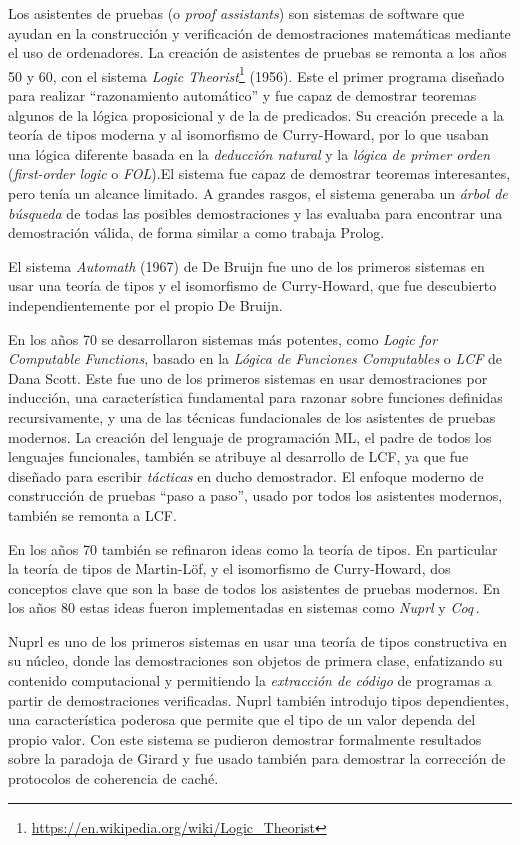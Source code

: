 \documentclass[
  a4paper, 
  10pt, 
  parskip=half, 
  toc=bibliography,
]{scrbook}
\theoremstyle{definition}
\theoremstyle{bolddef}
\begin{document}
Los asistentes de pruebas (o \emph{proof assistants}) son sistemas de software que ayudan en la
construcción y verificación de demostraciones matemáticas mediante el uso de
ordenadores. La creación de asistentes de pruebas se remonta a los años 50 y 60, con
el sistema \emph{Logic Theorist}\footnote{\url{https://en.wikipedia.org/wiki/Logic_Theorist}} (1956). 
Este el primer programa diseñado para realizar \enquote{razonamiento automático} y
fue capaz de demostrar teoremas algunos de la lógica proposicional y de la de predicados. 
Su creación precede a la teoría de tipos moderna y 
al isomorfismo de Curry-Howard, por lo que usaban una
lógica diferente basada en la \emph{deducción natural} y la \emph{lógica de primer orden}
(\emph{first-order logic} o \emph{FOL}).\@ El sistema fue capaz de demostrar teoremas
interesantes, pero tenía un alcance limitado. A grandes rasgos, el sistema
generaba un \emph{árbol de búsqueda} de todas las posibles demostraciones y
las evaluaba para encontrar una demostración válida, de forma similar a 
como trabaja Prolog.

El sistema \emph{Automath} (1967) de De Bruijn fue uno de los primeros
sistemas en usar una teoría de tipos y el isomorfismo de Curry-Howard, que fue 
descubierto independientemente por el propio De Bruijn.

En los años 70 se desarrollaron sistemas más potentes, como \emph{Logic for Computable Functions}, 
basado en la \emph{Lógica de Funciones Computables} o \emph{LCF} de Dana Scott. Este fue uno de los
primeros sistemas en usar demostraciones por inducción, una característica fundamental
para razonar sobre funciones definidas recursivamente, y una de las técnicas 
fundacionales de los asistentes de pruebas modernos. La creación del
lenguaje de programación ML, el padre de todos los lenguajes funcionales, también
se atribuye al desarrollo de LCF, ya que fue diseñado para escribir \emph{tácticas}
en ducho demostrador. El enfoque moderno de construcción de pruebas \enquote{paso a paso},
usado por todos los asistentes modernos, también se remonta a LCF.\@

En los años 70 también se refinaron ideas como la teoría de tipos. En
particular la teoría de tipos de Martin-Löf, y el isomorfismo de Curry-Howard,
dos conceptos clave que son la base de todos los asistentes de pruebas modernos.
En los años 80 estas ideas fueron implementadas en sistemas como \emph{Nuprl} y
\emph{Coq}\,.

Nuprl es uno de los primeros sistemas en usar una teoría de tipos
constructiva en su núcleo, donde las demostraciones son objetos de primera clase,
enfatizando su contenido computacional y permitiendo la \emph{extracción de
código} de programas a partir de demostraciones verificadas. Nuprl también
introdujo tipos dependientes, una característica poderosa que permite que el
tipo de un valor dependa del propio valor. Con este sistema se pudieron demostrar
formalmente resultados sobre la paradoja de Girard y fue usado también para
demostrar la corrección de protocolos de coherencia de caché.
\end{document}
